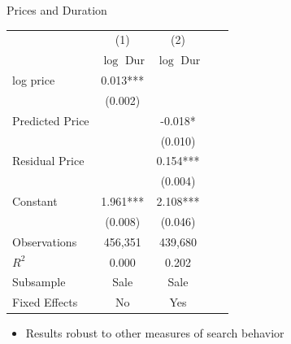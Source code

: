 \documentclass[english,xcolor=svgnames,aspectratio=169]{beamer}
\begin{document}
\begin{frame}[label=pricesduration]{Prices and Duration}



\begin{table}
\scriptsize
{
\begin{tabular}{l*{4}{c}}
\hline\hline
                              &\multicolumn{1}{c}{(1)}&\multicolumn{1}{c}{(2)}\\
                              &\multicolumn{1}{c}{$\log$ Dur}&\multicolumn{1}{c}{$\log$ Dur}\\
\hline
log price                     &     0.013***&            \\
                              &   (0.002)   &             \\
Predicted Price               &             &    -0.018*   \\
                              &             &   (0.010)    \\
Residual Price                &             &     0.154***&  \\
                              &             &   (0.004)   &   \\
Constant                      &     1.961***&     2.108***\\
                              &   (0.008)   &   (0.046)      \\
\hline
Observations                  &    456,351   &    439,680   \\
\(R^{2}\)                     &     0.000   &     0.202     \\
Subsample                    &      Sale   &      Sale   \\
Fixed Effects                 &        No   &       Yes    \\
\hline\hline
\end{tabular}
}
\end{table}
\begin{itemize}
\item Results robust to other measures of search behavior 
\end{itemize}
\end{frame}

\end{document}
